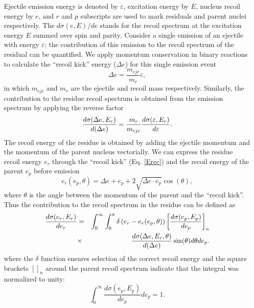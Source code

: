 Ejectile emission energy is denoted by $\varepsilon$, excitation energy by $%
E $, nucleus recoil energy by $e$, and $r$ and $p$ subscripts are used to
mark residuals and parent nuclei respectively. The $d\sigma(e,E)/de$ stands
for the recoil spectrum at the excitation energy $E$ summed over spin and
parity. Consider a single emission of an ejectile with energy $\varepsilon$;
the contribution of this emission to the recoil spectrum of the residual can
be quantified. We apply momentum conservation in binary reactions to
calculate the {}``recoil kick'' energy ($\Delta e$) for this single emission
event 
\begin{equation}
\Delta e=\frac{m_{ejc}}{m_{r}}\varepsilon,  \label{Erec}
\end{equation}
in which $m_{ejc}$ and $m_{r}$ are the ejectile and recoil mass
respectively. Similarly, the contribution to the residue recoil spectrum is
obtained from the emission spectrum by applying the reverse factor 
\begin{equation}
\frac{d\sigma(\Delta e,E_{r})}{d(\Delta e)}=\frac{m_{r}}{m_{ejc}}\frac{%
d\sigma(\varepsilon,E_{r})}{d\varepsilon}.  \label{CSkick}
\end{equation}
The recoil energy of the residue is obtained by adding the ejectile momentum
and the momentum of the parent nucleus vectorially. We can express the
residue recoil energy $e_{r}$ through the {}``recoil kick'' (Eq. \ref{Erec})
and the recoil energy of the parent $e_{p}$ before emission 
\begin{equation}
e_{r}(e_{p},\theta)=\Delta e+e_{p}+2\sqrt{\Delta e\cdot e_{p}}\cos(\theta),
\label{Eresrec}
\end{equation}
\noindent where $\theta$ is the angle between the momentum of the parent and
the {}``recoil kick''. Thus the contribution to the recoil spectrum in the
residue can be defined as 
\begin{eqnarray}
\frac{d\sigma(e_{r},E_{r})}{de_{r}}&=&\int_{0}^{\infty}\int_{0}^{\pi}\delta%
\left(e_{r}-e_{r}(e_{p},\theta)\right)\left[\frac{d\sigma(e_{p},E_{p})}{%
de_{p}}\right]_{n}  \notag \\
&\times&\frac{d\sigma(\Delta e,E_{r},\theta)}{d(\Delta e)}%
\sin(\theta)d\theta de_{p}.  \label{CSrec}
\end{eqnarray}
\noindent where the $\delta$ function ensures selection of the correct
recoil energy and the square brackets $\left[\right]_{n}$ around the parent
recoil spectrum indicate that the integral was normalized to unity: 
\begin{equation}
\int_{0}^{\infty}\frac{d\sigma(e_{p},E_{p})}{de_{p}}de_{p}=1.
\end{equation}
